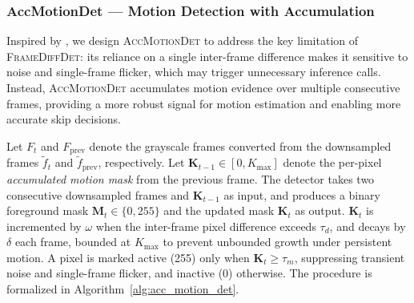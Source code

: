 \documentclass[final,3p,times,twocolumn]{elsarticle}
\begin{document}
\subsubsection{AccMotionDet --- Motion Detection with Accumulation}\label{accmotiondet-motion-detection-with-accumulation}

Inspired by \cite{yu2013real}, we design \textsc{AccMotionDet} to
address the key limitation of \textsc{FrameDiffDet}: its reliance on a
single inter-frame difference makes it sensitive to noise and
single-frame flicker, which may trigger unnecessary inference calls.
Instead, \textsc{AccMotionDet} accumulates motion evidence over multiple
consecutive frames, providing a more robust signal for motion estimation
and enabling more accurate skip decisions.

Let $F_t$ and $F_{\text{prev}}$ denote the grayscale frames converted
from the downsampled frames $\tilde{f}_t$ and $\tilde{f}_{\text{prev}}$,
respectively. Let $\mathbf{K}_{t-1} \in [0, K_{\max}]$ denote the
per-pixel \textit{accumulated motion mask} from the previous frame. The
detector takes two consecutive downsampled frames and $\mathbf{K}_{t-1}$
as input, and produces a binary foreground mask
$\mathbf{M}_t \in \{0, 255\}$ and the updated mask $\mathbf{K}_t$ as
output. $\mathbf{K}_t$ is incremented by $\omega$ when the inter-frame
pixel difference exceeds $\tau_d$, and decays by $\delta$ each frame,
bounded at $K_{\max}$ to prevent unbounded growth under persistent
motion. A pixel is marked active (255) only when
$\mathbf{K}_t \geq \tau_m$, suppressing transient noise and
single-frame flicker, and inactive (0) otherwise. The procedure is
formalized in Algorithm~\ref{alg:acc_motion_det}.
\end{document}
